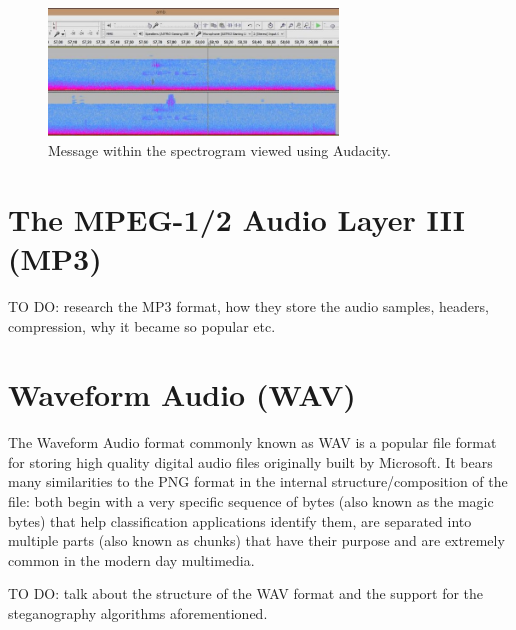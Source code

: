 \begin{multicols}{2}
\begin{figure}[H]
    \centering
    \includegraphics[width=7.7cm,keepaspectratio]{pics/audio_chapter/spectrogram_encoding.jpg}
    \caption{Message within the spectrogram viewed using Audacity.}
    \label{battlefield_spectrogram_easter_egg}
\end{figure}


\section{The MPEG-1/2 Audio Layer III (MP3)}
TO DO: research the MP3 format, how they store the audio samples, headers, compression, why it became so popular etc.

\section{Waveform Audio (WAV)}
The Waveform Audio format commonly known as WAV is a popular file format for storing high quality digital audio files originally built by Microsoft. It bears many similarities to the PNG format in the internal structure/composition of the file: both begin with a very specific sequence of bytes (also known as the magic bytes) that help classification applications identify them, are separated into multiple parts (also known as chunks) that have their purpose and are extremely common in the modern day multimedia.

TO DO: talk about the structure of the WAV format and the support for the steganography algorithms aforementioned.
\end{multicols}